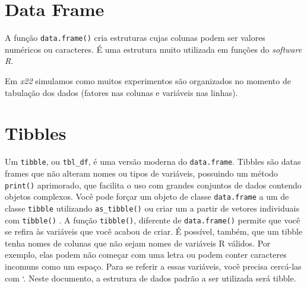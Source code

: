 \documentclass[
]{book}
\newenvironment{Shaded}{\begin{snugshade}}{\end{snugshade}}
\newcommand{\CommentTok}[1]{\textcolor[rgb]{0.56,0.35,0.01}{\textit{#1}}}
\newcommand{\DataTypeTok}[1]{\textcolor[rgb]{0.13,0.29,0.53}{#1}}
\newcommand{\DecValTok}[1]{\textcolor[rgb]{0.00,0.00,0.81}{#1}}
\newcommand{\KeywordTok}[1]{\textcolor[rgb]{0.13,0.29,0.53}{\textbf{#1}}}
\newcommand{\NormalTok}[1]{#1}
\newcommand{\StringTok}[1]{\textcolor[rgb]{0.31,0.60,0.02}{#1}}
\begin{document}
\hypertarget{data-frame}{%
\section{Data Frame}\label{data-frame}}

A função \texttt{data.frame()}  cria estruturas cujas colunas podem ser valores numéricos ou caracteres. É uma estrutura muito utilizada em funções do \emph{software R}.

\begin{Shaded}
\end{Shaded}

Em \emph{x22} simulamos como muitos experimentos são organizados no momento de tabulação dos dados (fatores nas colunas e variáveis nas linhas).

\hypertarget{tibbles}{%
\section{Tibbles}\label{tibbles}}

Um \texttt{tibble}, ou \texttt{tbl\_df}, é uma versão moderna do \texttt{data.frame}. Tibbles são datas frames que não alteram nomes ou tipos de variáveis, possuindo um método \texttt{print()} aprimorado, que facilita o uso com grandes conjuntos de dados contendo objetos complexos. Você pode forçar um objeto de classe \texttt{data.frame} a um de classe \texttt{tibble} utilizando \texttt{as\_tibble()}  ou criar um a partir de vetores individuais com \texttt{tibble()} . A função \texttt{tibble()}, diferente de \texttt{data.frame()} permite que você se refira às variáveis que você acabou de criar. É possível, também, que um tibble tenha nomes de colunas que não sejam nomes de variáveis R válidos. Por exemplo, elas podem não começar com uma letra ou podem conter caracteres incomuns como um espaço. Para se referir a essas variáveis, você precisa cercá-las com `. Neste documento, a estrutura de dados padrão a ser utilizada será tibble.
\end{document}
